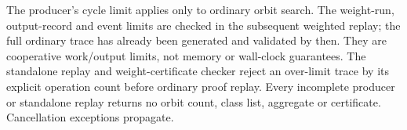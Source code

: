 The producer's cycle limit applies only to ordinary orbit search. The
weight-run, output-record and event limits are checked in the subsequent
weighted replay; the full ordinary trace has already been generated and
validated by then. They are cooperative work/output limits, not memory
or wall-clock guarantees. The standalone replay and weight-certificate
checker reject an over-limit trace by its explicit operation count before
ordinary proof replay. Every incomplete producer or standalone replay
returns no orbit count, class list, aggregate or certificate. Cancellation
exceptions propagate.
